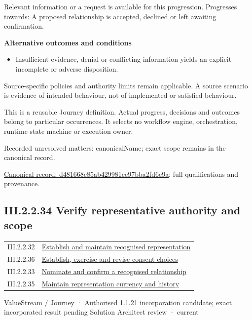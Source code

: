 Relevant information or a request is available for this progression. Progresses towards: A proposed relationship is accepted, declined or left awaiting confirmation.



\par\medskip\textbf{Alternative outcomes and conditions}\par


\begin{itemize}


\item Insufficient evidence, denial or conflicting information yields an explicit incomplete or adverse disposition.

\end{itemize}


Source-specific policies and authority limits remain applicable. A source scenario is evidence of intended behaviour, not of implemented or satisfied behaviour.



This is a reusable Journey definition. Actual progress, decisions and outcomes belong to particular occurrences. It selects no workflow engine, orchestration, runtime state machine or execution owner.


{\small Recorded unresolved matters: canonicalName; exact scope remains in the canonical record.}\par
{\footnotesize \href{../../../../continuum/strategy/value-stream/d481668c85ab429981ce97bba2fd6e9a.md}{Canonical record: d481668c85ab429981ce97bba2fd6e9a}; full qualifications and provenance.}\par
\subsection*{III.2.2.34 Verify representative authority and scope}
\label{navigation:III.2.2.34}

\begin{longtable}{p{.22\linewidth}p{.73\linewidth}}
III.2.2.32 & \hyperref[element:45372a8e0fc64dd3ba0f2cc4b14b0ee3]{Establish and maintain recognised representation} \\
III.2.2.36 & \hyperref[element:850bba32295c4e53b20036b80f77f491]{Establish, exercise and revise consent choices} \\
III.2.2.33 & \hyperref[element:d481668c85ab429981ce97bba2fd6e9a]{Nominate and confirm a recognised relationship} \\
III.2.2.35 & \hyperref[element:fa9998f53cd64832abe79b40904440f5]{Maintain representation currency and history} \\
\end{longtable}
\label{element:ee60990709724506905c5dbe8e21261a}
{\small ValueStream / Journey · Authorised 1.1.21 incorporation candidate; exact incorporated result pending Solution Architect review · current}\par

